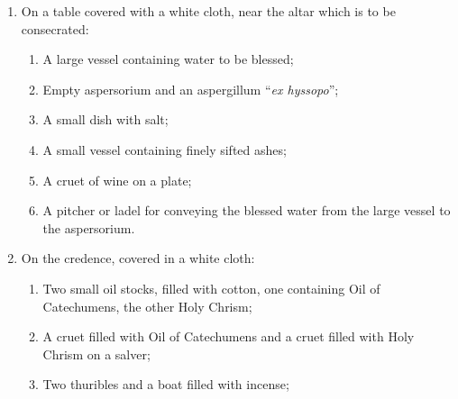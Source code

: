 \documentclass[letterpaper]{report}
\begin{document}
{\begin{enumerate}[label=\Roman*.]
\begin{enumerate}[label=\arabic*.]
                \item In the middle of the church a faldstool and a cushion of
                    a piece of carpet;

                \item A candle-lighter and matches.

            \end{enumerate}

        \item On a table covered with a white cloth, near the altar which is to
            be consecrated:

            \begin{enumerate}[label=\arabic*.]

                \item A large vessel containing water to be blessed;

                \item Empty aspersorium and an aspergillum ``\textit{ex
                    hyssopo}'';

                \item A small dish with salt;

                \item A small vessel containing finely sifted ashes;

                \item A cruet of wine on a plate;

                \item A pitcher or ladel for conveying the blessed water from
                    the large vessel to the aspersorium.

            \end{enumerate}

        \item On the credence, covered in a white cloth:

            \begin{enumerate}[label=\arabic*.]

                \item Two small oil stocks, filled with cotton, one containing
                    Oil of Catechumens, the other Holy Chrism;

                \item A cruet filled with Oil of Catechumens and a cruet filled
                    with Holy Chrism on a salver;

                \item Two thuribles and a boat filled with incense;


\end{enumerate}
\end{enumerate}}
\end{document}
